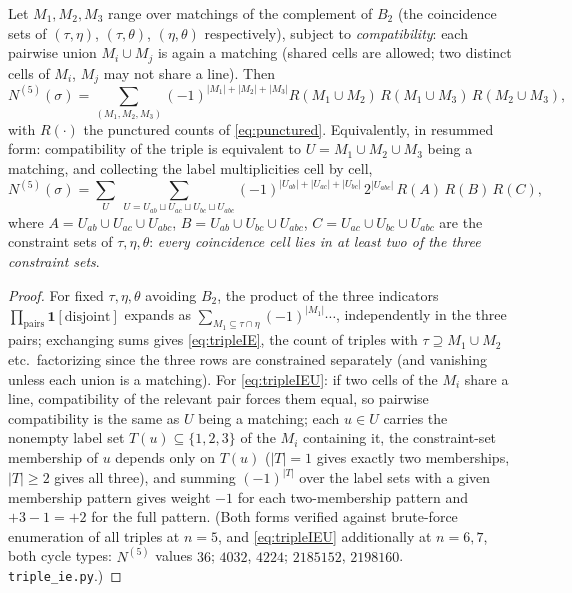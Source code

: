 \begin{proposition}\label{prop:tripleIE}
Let $M_1,M_2,M_3$ range over matchings of the complement of $B_2$
(the coincidence sets of $(\tau,\eta)$, $(\tau,\theta)$,
$(\eta,\theta)$ respectively), subject to \emph{compatibility}: each
pairwise union $M_i\cup M_j$ is again a matching (shared cells are
allowed; two distinct cells of $M_i$, $M_j$ may not share a line).
Then
\begin{equation}\label{eq:tripleIE}
N^{(5)}(\sigma)=\sum_{(M_1,M_2,M_3)}(-1)^{|M_1|+|M_2|+|M_3|}
R(M_1{\cup}M_2)\,R(M_1{\cup}M_3)\,R(M_2{\cup}M_3),
\end{equation}
with $R(\cdot)$ the punctured counts of \eqref{eq:punctured}.
Equivalently, in resummed form: compatibility of the triple is
equivalent to $U=M_1\cup M_2\cup M_3$ being a matching, and collecting
the label multiplicities cell by cell,
\begin{equation}\label{eq:tripleIEU}
N^{(5)}(\sigma)=\sum_{U}\ \sum_{U=U_{ab}\sqcup U_{ac}\sqcup U_{bc}\sqcup U_{abc}}
(-1)^{|U_{ab}|+|U_{ac}|+|U_{bc}|}\,2^{|U_{abc}|}\,
R(A)\,R(B)\,R(C),
\end{equation}
where $A=U_{ab}\cup U_{ac}\cup U_{abc}$,
$B=U_{ab}\cup U_{bc}\cup U_{abc}$, $C=U_{ac}\cup U_{bc}\cup U_{abc}$
are the constraint sets of $\tau,\eta,\theta$: \emph{every coincidence
cell lies in at least two of the three constraint sets}.
\end{proposition}

\begin{proof}
For fixed $\tau,\eta,\theta$ avoiding $B_2$, the product of the three
indicators $\prod_{\text{pairs}}\mathbf 1[\text{disjoint}]$ expands as
$\sum_{M_1\subseteq\tau\cap\eta}(-1)^{|M_1|}\cdots$, independently in
the three pairs; exchanging sums gives \eqref{eq:tripleIE}, the count of
triples with $\tau\supseteq M_1\cup M_2$ etc.\ factorizing since the
three rows are constrained separately (and vanishing unless each union
is a matching).  For \eqref{eq:tripleIEU}: if two cells of the $M_i$
share a line, compatibility of the relevant pair forces them equal, so
pairwise compatibility is the same as $U$ being a matching; each
$u\in U$ carries the nonempty label set $T(u)\subseteq\{1,2,3\}$ of the
$M_i$ containing it, the constraint-set membership of $u$ depends only
on $T(u)$ ($|T|=1$ gives exactly two memberships, $|T|\ge2$ gives all
three), and summing $(-1)^{|T|}$ over the label sets with a given
membership pattern gives weight $-1$ for each two-membership pattern
and $+3-1=+2$ for the full pattern.
(Both forms verified against brute-force enumeration of all triples at
$n=5$, and \eqref{eq:tripleIEU} additionally at $n=6,7$, both cycle
types: $N^{(5)}$ values $36$; $4032$, $4224$; $2185152$, $2198160$.
\texttt{triple\_ie.py}.)
\end{proof}

